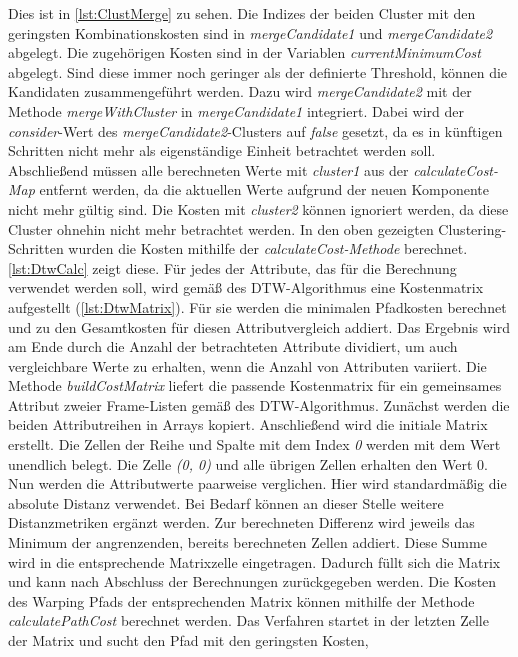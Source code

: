 Dies ist in \autoref{lst:ClustMerge} zu sehen.
Die Indizes der beiden Cluster mit den geringsten Kombinationskosten sind
in \emph{mergeCandidate1} und \emph{mergeCandidate2} abgelegt.
Die zugehörigen Kosten sind in der Variablen \emph{currentMinimumCost} abgelegt.
Sind diese immer noch geringer als der definierte Threshold, können die Kandidaten zusammengeführt werden.
Dazu wird \emph{mergeCandidate2} mit der Methode \emph{mergeWithCluster} in \emph{mergeCandidate1} integriert.
Dabei wird der \emph{consider}-Wert des \emph{mergeCandidate2}-Clusters auf \emph{false} gesetzt,
da es in künftigen Schritten nicht mehr als eigenständige Einheit betrachtet werden soll.
Abschließend müssen alle berechneten Werte mit \emph{cluster1} aus der \emph{calculateCost-Map} entfernt werden,
da die aktuellen Werte aufgrund der neuen Komponente nicht mehr gültig sind.
Die Kosten mit \emph{cluster2} können ignoriert werden, da diese Cluster ohnehin nicht mehr betrachtet werden.
In den oben gezeigten Clustering-Schritten wurden die Kosten mithilfe der \emph{calculateCost-Methode} berechnet.
\autoref{lst:DtwCalc} zeigt diese.
Für jedes der Attribute, das für die Berechnung verwendet werden soll, wird gemäß des \ac{DTW}-Algorithmus
eine Kostenmatrix aufgestellt (\autoref{lst:DtwMatrix}).
Für sie werden die minimalen Pfadkosten berechnet und zu den Gesamtkosten für diesen Attributvergleich addiert.
Das Ergebnis wird am Ende durch die Anzahl der betrachteten Attribute dividiert,
um auch vergleichbare Werte zu erhalten, wenn die Anzahl von Attributen variiert.
Die Methode \emph{buildCostMatrix} liefert die passende Kostenmatrix für ein gemeinsames Attribut
zweier Frame-Listen gemäß des \ac{DTW}-Algorithmus.
Zunächst werden die beiden Attributreihen in Arrays kopiert.
Anschließend wird die initiale Matrix erstellt.
Die Zellen der Reihe und Spalte mit dem Index \emph{0} werden mit dem Wert {\glqq unendlich\grqq} belegt.
Die Zelle \emph{(0, 0)} und alle übrigen Zellen erhalten den Wert 0.
Nun werden die Attributwerte paarweise verglichen.
Hier wird standardmäßig die absolute Distanz verwendet.
Bei Bedarf können an dieser Stelle weitere Distanzmetriken ergänzt werden.
Zur berechneten Differenz wird jeweils das Minimum der angrenzenden, bereits berechneten Zellen addiert.
Diese Summe wird in die entsprechende Matrixzelle eingetragen.
Dadurch füllt sich die Matrix und kann nach Abschluss der Berechnungen zurückgegeben werden.
Die Kosten des Warping Pfads der entsprechenden Matrix können mithilfe der Methode \emph{calculatePathCost}
berechnet werden.
Das Verfahren startet in der letzten Zelle der Matrix und sucht den Pfad mit den geringsten Kosten,
